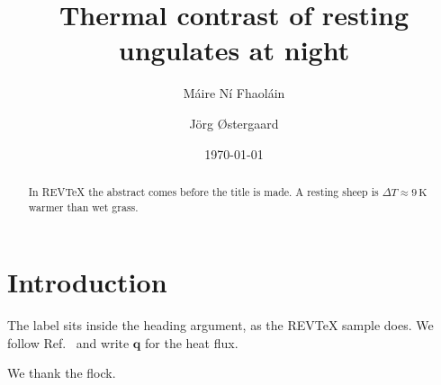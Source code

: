 \documentclass[aps,prl,twocolumn,superscriptaddress]{revtex4-2}
\begin{document}
\title{Thermal contrast of resting ungulates at night}
\author{M\'aire N\'i Fhaol\'ain}
\author{J\"org \O{}stergaard}
\date{\today}
\begin{abstract}
In REVTeX the abstract comes before the title is made. A resting sheep is $\Delta T \approx 9\,\mathrm{K}$ warmer than wet grass.
\end{abstract}
\maketitle
\section{\label{sec:level1}Introduction}
The label sits inside the heading argument, as the REVTeX sample does. We follow Ref.~ and write $\bm{q}$ for the heat flux.
\begin{acknowledgments}
We thank the flock.
\end{acknowledgments}

\end{document}
